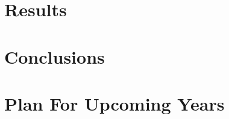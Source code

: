 \documentclass[lmr,second,hyperref,rgb,hyperref,dvipsnames]{uom_thesis_casson}
\begin{document}
\chapter{Results} \label{ch:results}

\cleardoublepage

\chapter{Conclusions} \label{ch:conc}

\cleardoublepage

\chapter{Plan For Upcoming Years} \label{ch:plan}

\cleardoublepage


\printbibliography[title={References},heading=bibintoc]
\end{document}
